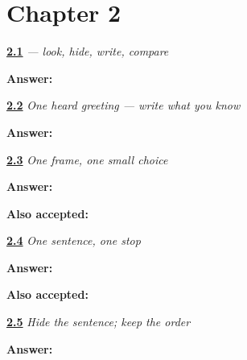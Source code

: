 \section*{Chapter 2}

\noindent\begin{minipage}[t]{\linewidth}
\raggedright
\hyperlink{review-HI-W05-namaste-delayed-copy-check}{\textbf{2.1}} \emph{ — look, hide, write, compare}\par
\small \textbf{Answer:} \par
\end{minipage}\par\medskip

\noindent\begin{minipage}[t]{\linewidth}
\raggedright
\hyperlink{review-HI-W05-namaste-dictation-answer}{\textbf{2.2}} \emph{One heard greeting — write what you know}\par
\small \textbf{Answer:} \par
\end{minipage}\par\medskip

\noindent\begin{minipage}[t]{\linewidth}
\raggedright
\hyperlink{review-HI-W06-name-sentence-frame-check}{\textbf{2.3}} \emph{One frame, one small choice}\par
\small \textbf{Answer:}    \par
\footnotesize \textbf{Also accepted:}    
\end{minipage}\par\medskip

\noindent\begin{minipage}[t]{\linewidth}
\raggedright
\hyperlink{review-HI-W06-name-sentence-stop-check}{\textbf{2.4}} \emph{One sentence, one stop}\par
\small \textbf{Answer:}    \par
\footnotesize \textbf{Also accepted:}    
\end{minipage}\par\medskip

\noindent\begin{minipage}[t]{\linewidth}
\raggedright
\hyperlink{review-HI-W06-name-sentence-delayed-check}{\textbf{2.5}} \emph{Hide the sentence; keep the order}\par
\small \textbf{Answer:}    \par
\end{minipage}\par\medskip

